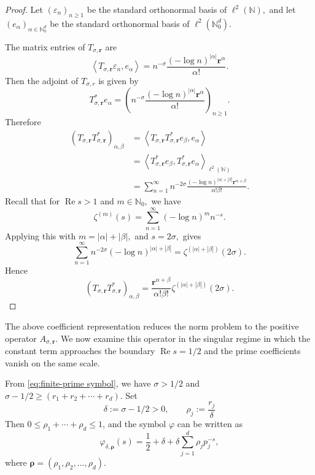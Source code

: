 \documentclass[12pt, reqno]{amsart}
\numberwithin{equation}{section}
\begin{document}
\begin{proof}
Let $(\varepsilon_n)_{n\geq 1}$ be the standard orthonormal basis of $\ell^2(\mathbb{N}),$ and let $(e_{\alpha})_{\alpha\in\mathbb{N}_{0}^{d}}$ be the standard orthonormal basis of $\ell^2(\mathbb{N}_{0}^{d}).$

The matrix entries of \(T_{\sigma,\boldsymbol{r}}\) are
\[
\left\langle T_{\sigma,\boldsymbol{r}}\varepsilon_n,e_{\alpha}\right\rangle
=
n^{-\sigma}
\frac{(-\log n)^{|\alpha|}\boldsymbol{r}^{\alpha}}{\alpha!}.
\]
Then the adjoint of $T_{\sigma,r} $ is given by
\[
T_{\sigma,\boldsymbol{r}}^{*}e_{\alpha}
=
\left(
n^{-\sigma}
\frac{(-\log n)^{|\alpha|}\boldsymbol{r}^{\alpha}}{\alpha!}
\right)_{n\geq 1}.
\]
Therefore
\[
\begin{aligned}
(T_{\sigma,\boldsymbol{r}}T_{\sigma,\boldsymbol{r}}^{*})_{\alpha,\beta}
&=
\left\langle
T_{\sigma,\boldsymbol{r}}T_{\sigma,\boldsymbol{r}}^{*}e_{\beta},
e_{\alpha}
\right\rangle                                                      \\
&=
\left\langle
T_{\sigma,\boldsymbol{r}}^{*}e_{\beta},
T_{\sigma,\boldsymbol{r}}^{*}e_{\alpha}
\right\rangle_{\ell^2(\mathbb{N})}                                  \\
&=
\sum_{n=1}^{\infty}
n^{-2\sigma}
\frac{(-\log n)^{|\alpha|+|\beta|}
\boldsymbol{r}^{\alpha+\beta}}
{\alpha!\beta!}.
\end{aligned}
\]
Recall that for $\operatorname{Re}s>1$ and $m\in\mathbb{N}_{0},$ we have
\[
\zeta^{(m)}(s)
=
\sum_{n=1}^{\infty}
(-\log n)^m n^{-s}.
\]
Applying this with
$m=|\alpha|+|\beta|,$ and $s=2\sigma,$ gives
\[
\sum_{n=1}^{\infty}
n^{-2\sigma}
(-\log n)^{|\alpha|+|\beta|}
=
\zeta^{(|\alpha|+|\beta|)}(2\sigma).
\]
Hence
\[
(T_{\sigma,\boldsymbol{r}}T_{\sigma,\boldsymbol{r}}^{*})_{\alpha,\beta}
=
\frac{\boldsymbol{r}^{\alpha+\beta}}{\alpha!\beta!}
\zeta^{(|\alpha|+|\beta|)}(2\sigma).
\]
\end{proof}
The above coefficient representation reduces the norm problem to the positive
operator $A_{\sigma,\boldsymbol r}$. We now examine
this operator in the singular regime in which the constant term
approaches the boundary $\operatorname{Re}s=1/2$ and the prime
coefficients vanish on the same scale.

From \eqref{eq:finite-prime symbol}, we have $\sigma>1/2$ and $\sigma-1/2\geq(r_1+r_2+\cdots+r_d).$  Set
\[\delta:=\sigma-1/2>0, \qquad \rho_j:=\frac{r_j}{\delta}\]
Then $0\leq\rho_1 +\cdots+\rho_d\leq1$, and the  symbol $\varphi$ can be written as
\begin{equation}\label{eq:scaling symbol}
\varphi_{\delta,\boldsymbol{\rho}}(s)
=
\frac{1}{2}+\delta+\delta\sum_{j=1}^{d}\rho_jp_j^{-s},
\end{equation}
where $\boldsymbol{\rho}=(\rho_1, \rho_2,\ldots,\rho_d).$
\end{document}
